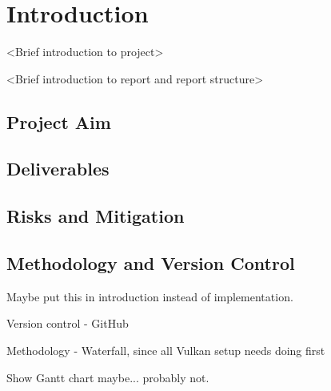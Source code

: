 \chapter{Introduction}
\label{chapter1}

<Brief introduction to project>

<Brief introduction to report and report structure>

\section{Project Aim}

\section{Deliverables}

\section{Risks and Mitigation}

\section{Methodology and Version Control}

Maybe put this in introduction instead of implementation.

Version control - GitHub

Methodology - Waterfall, since all Vulkan setup needs doing first

Show Gantt chart maybe... probably not.
